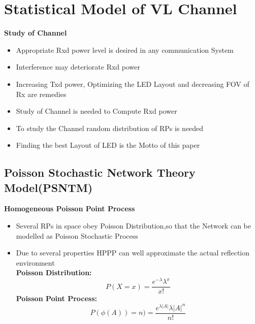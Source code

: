 \documentclass[9pt, dvipsnames]{beamer} %
\begin{document}
\section{Statistical Model of VL Channel}

   \begin{frame}{\textbf {Study of Channel}}
             \begin{itemize}
              \item Appropriate Rxd power level is desired in any communication System
              \item Interference may deteriorate Rxd power
              \item Increasing Txd power, Optimizing the LED Layout and decreasing FOV of Rx are remedies
              \item Study of Channel is needed to Compute Rxd power
              \item To study the Channel random distribution of RPs is needed
              \item Finding the best Layout of LED is the Motto of this paper
             
             \end{itemize}
   \end{frame}


\subsection{Poisson Stochastic Network Theory Model(PSNTM)}
  \begin{frame}{\textbf {Homogeneous Poisson Point Process}}
             \begin{itemize}
              \item Several RPs in space obey Poisson Distribution,so that the Network can be modelled as Poisson Stochastic Process 
              \item Due to several properties HPPP can well approximate the actual reflection environment\\ 
              \textbf{Poisson Distribution:}
              \begin{equation}
                  P(X=x)=\frac{e^{-\lambda}\lambda^{x}}{x!}
              \end{equation}
              \textbf{Poisson Point Process:}
              \begin{equation}
                  P(\phi(A) )=n)=\frac{e^{\lambda|A|}\lambda|A|^{n}}{n!}
              \end{equation}
             \end{itemize}
   \end{frame}
   
\end{document}
